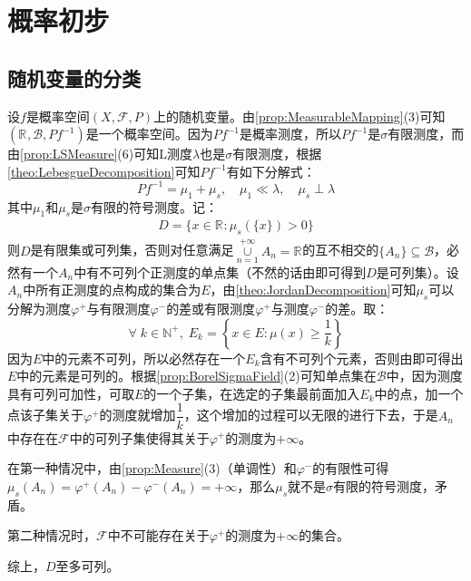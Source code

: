 \chapter{概率初步}

\section{随机变量的分类}
设$f$是概率空间$(X,\mathscr{F},P)$上的随机变量。由\cref{prop:MeasurableMapping}(3)可知$(\mathbb{R}^{},\mathcal{B},Pf^{-1})$是一个概率空间。因为$Pf^{-1}$是概率测度，所以$Pf^{-1}$是$\sigma$有限测度，而由\cref{prop:LSMeasure}(6)可知L测度$\lambda$也是$\sigma$有限测度，根据\cref{theo:LebesgueDecomposition}可知$Pf^{-1}$有如下分解式：
\begin{equation*}
	Pf^{-1}=\mu_1+\mu_s,\quad\mu_1\ll\lambda,\quad\mu_s\perp\lambda
\end{equation*}
其中$\mu_1$和$\mu_s$是$\sigma$有限的符号测度。记：
\begin{gather*}
	D=\{x\in\mathbb{R}^{}:\mu_s(\{x\})>0\}
\end{gather*}
则$D$是有限集或可列集，否则对任意满足$\underset{n=1}{\overset{+\infty}{\cup}}A_n=\mathbb{R}^{}$的互不相交的$\{A_n\}\subseteq\mathcal{B}$，必然有一个$A_n$中有不可列个正测度的单点集（不然的话由即可得到$D$是可列集）。设$A_n$中所有正测度的点构成的集合为$E$，由\cref{theo:JordanDecomposition}可知$\mu_s$可以分解为测度$\varphi^+$与有限测度$\varphi^-$的差或有限测度$\varphi^+$与测度$\varphi^-$的差。取：
\begin{equation*}
	\forall\;k\in\mathbb{N}^+,\;E_k=\left\{x\in E:\mu(x)\geqslant\frac{1}{k}\right\}
\end{equation*}
因为$E$中的元素不可列，所以必然存在一个$E_k$含有不可列个元素，否则由即可得出$E$中的元素是可列的。根据\cref{prop:BorelSigmaField}(2)可知单点集在$\mathcal{B}$中，因为测度具有可列可加性，可取$E$的一个子集，在选定的子集最前面加入$E_k$中的点，加一个点该子集关于$\varphi^+$的测度就增加$\dfrac{1}{k}$，这个增加的过程可以无限的进行下去，于是$A_n$中存在在$\mathscr{F}$中的可列子集使得其关于$\varphi^+$的测度为$+\infty$。\par
在第一种情况中，由\cref{prop:Measure}(3)（单调性）和$\varphi^-$的有限性可得$\mu_s(A_n)=\varphi^+(A_n)-\varphi^-(A_n)=+\infty$，那么$\mu_s$就不是$\sigma$有限的符号测度，矛盾。\par
第二种情况时，$\mathscr{F}$中不可能存在关于$\varphi^+$的测度为$+\infty$的集合。\par
综上，$D$至多可列。\par
